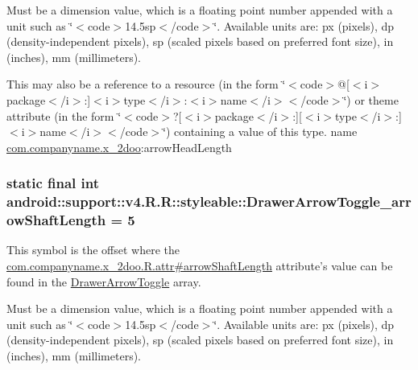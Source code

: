 Must be a dimension value, which is a floating point number appended with a unit such as \char`\"{}$<$code$>$14.5sp$<$/code$>$\char`\"{}. Available units are: px (pixels), dp (density-independent pixels), sp (scaled pixels based on preferred font size), in (inches), mm (millimeters). 

This may also be a reference to a resource (in the form \char`\"{}$<$code$>$@\mbox{[}$<$i$>$package$<$/i$>$:\mbox{]}$<$i$>$type$<$/i$>$:$<$i$>$name$<$/i$>$$<$/code$>$\char`\"{}) or theme attribute (in the form \char`\"{}$<$code$>$?\mbox{[}$<$i$>$package$<$/i$>$:\mbox{]}\mbox{[}$<$i$>$type$<$/i$>$:\mbox{]}$<$i$>$name$<$/i$>$$<$/code$>$\char`\"{}) containing a value of this type.  name \hyperlink{namespacecom_1_1companyname_1_1x__2doo}{com.companyname.x\_\-2doo}:arrowHeadLength \hypertarget{classandroid_1_1support_1_1v4_1_1_r_1_1styleable_019721c1dd6ebdd0cf7066eefbb929f5}{
\subsubsection[{DrawerArrowToggle\_\-arrowShaftLength}]{\setlength{\rightskip}{0pt plus 5cm}static final int android::support::v4.R.R::styleable::DrawerArrowToggle\_\-arrowShaftLength = 5}}
\label{classandroid_1_1support_1_1v4_1_1_r_1_1styleable_019721c1dd6ebdd0cf7066eefbb929f5}


This symbol is the offset where the \hyperlink{classcom_1_1companyname_1_1x__2doo_1_1_r_1_1attr_891da3a739d355886002d1c6ffaf78d2}{com.companyname.x\_\-2doo.R.attr\#arrowShaftLength} attribute's value can be found in the \hyperlink{classandroid_1_1support_1_1v4_1_1_r_1_1styleable_df2952a999161d3c408fb6267800afe6}{DrawerArrowToggle} array.

Must be a dimension value, which is a floating point number appended with a unit such as \char`\"{}$<$code$>$14.5sp$<$/code$>$\char`\"{}. Available units are: px (pixels), dp (density-independent pixels), sp (scaled pixels based on preferred font size), in (inches), mm (millimeters). 

